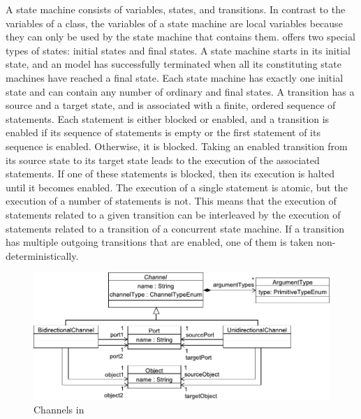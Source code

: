 A state machine consists of variables, states, and transitions.
In contrast to the variables of a class, the variables of a state machine are local variables because they can only be used by the state machine that contains them.
\SLCO offers two special types of states: initial states and final states.
A state machine starts in its initial state, and an \SLCO model has successfully terminated when all its constituting state machines have reached a final state.
Each state machine has exactly one initial state and can contain any number of ordinary and final states.
A transition has a source and a target state, and is associated with a finite, ordered sequence of statements.
Each statement is either blocked or enabled, and a transition is enabled if its sequence of statements is empty or the first statement of its sequence is enabled.
Otherwise, it is blocked.
Taking an enabled transition from its source state to its target state leads to the execution of the associated statements.
If one of these statements is blocked, then its execution is halted until it becomes enabled.
The execution of a single statement is atomic, but the execution of a number of statements is not.
This means that the execution of statements related to a given transition can be interleaved by the execution of statements related to a transition of a concurrent state machine.
If a transition has multiple outgoing transitions that are enabled, one of them is taken non-deterministically.

\begin{figure}[hbt]
  \centering
  \includegraphics[scale=0.6]{slco/figs/metamodel/mm_slco_chan}
  \caption{Channels in \SLCO}
  \label{fig:slco:MMChan}
\end{figure}

